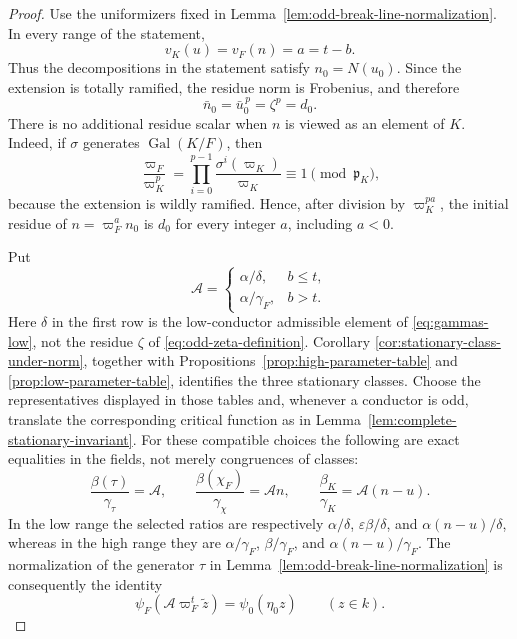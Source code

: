 \documentclass[11pt]{amsart}
\theoremstyle{definition}
\theoremstyle{remark}
\newcommand{\p}{\mathfrak p}
\newcommand{\Gal}{\operatorname{Gal}}
\begin{document}
\begin{proof}
Use the uniformizers fixed in
Lemma~\ref{lem:odd-break-line-normalization}.  In every range of the
statement,
\[
 v_K(u)=v_F(n)=a=t-b.
\]
Thus the decompositions in the statement satisfy $n_0=N(u_0)$.  Since
the extension is totally ramified, the residue norm is Frobenius, and
therefore
\begin{equation}\label{eq:odd-transport-leading-norm}
 \bar n_0=\bar u_0^{\,p}=\zeta^p=d_0.
\end{equation}
There is no additional residue scalar when $n$ is viewed as an element
of $K$.  Indeed, if $\sigma$ generates $\Gal(K/F)$, then
\[
 \frac{\varpi_F}{\varpi_K^p}
 =\prod_{i=0}^{p-1}\frac{\sigma^i(\varpi_K)}{\varpi_K}
 \equiv1\pmod{\p_K},
\]
because the extension is wildly ramified.  Hence, after division by
$\varpi_K^{pa}$, the initial residue of
$n=\varpi_F^a n_0$ is $d_0$ for every integer $a$, including $a<0$.

Put
\begin{equation}\label{eq:odd-A-definition}
 \mathcal A=
 \begin{cases}
  \alpha/\delta,&b\le t,\\[1mm]
  \alpha/\gamma_F,&b>t.
 \end{cases}
\end{equation}
Here $\delta$ in the first row is the low-conductor admissible element
of \eqref{eq:gammas-low}, not the residue $\zeta$ of
\eqref{eq:odd-zeta-definition}.  Corollary
\ref{cor:stationary-class-under-norm}, together with
Propositions~\ref{prop:high-parameter-table} and
\ref{prop:low-parameter-table}, identifies the three stationary
classes.  Choose the representatives displayed in those tables and,
whenever a conductor is odd, translate the corresponding critical
function as in Lemma~\ref{lem:complete-stationary-invariant}.  For these
compatible choices the following are exact equalities in the fields,
not merely congruences of classes:
\begin{equation}\label{eq:odd-three-stationary-ratios}
 \frac{\beta(\tau)}{\gamma_\tau}=\mathcal A,
 \qquad
 \frac{\beta(\chi_F)}{\gamma_{\chi}}=\mathcal A n,
 \qquad
 \frac{\beta_K}{\gamma_K}=\mathcal A(n-u).
\end{equation}
In the low range the selected ratios are respectively
$\alpha/\delta$, $\varepsilon\beta/\delta$, and
$\alpha(n-u)/\delta$, whereas in the high range they are
$\alpha/\gamma_F$, $\beta/\gamma_F$, and
$\alpha(n-u)/\gamma_F$.  The normalization of the generator $\tau$
in Lemma~\ref{lem:odd-break-line-normalization} is consequently the
identity
\begin{equation}\label{eq:odd-tau-last-layer-normalization}
 \psi_F(\mathcal A\varpi_F^t\widetilde z)
 =\psi_0(\eta_0z)\qquad(z\in k).
\end{equation}


\end{proof}
\end{document}
